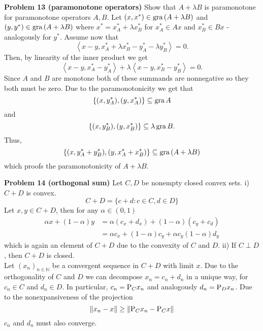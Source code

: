 \documentclass{scrartcl}
\newcommand{\N}{\mathbb{N}}
\newcommand{\sub}{\subseteq}
\theoremstyle{plain}
\theoremstyle{remark}
\renewcommand{\P}{\textup{P}}
\newcommand{\gr}{\textup{gra}\,}
\begin{document}
\textbf{Problem 13 (paramonotone operators)} Show that $A+\lambda B$ is paramonotone for paramonotone operators $A,B$.
Let $(x,x^*) \in  \gr (A+\lambda B)$ and $(y,y^*) \in \gr (A + \lambda B)$ where $x^* = x_A^* + \lambda x_B^*$ for $x_A^* \in Ax$ and $x_B^* \in Bx$ - analogously for $y^*$.
Assume now that
\begin{equation}
  \left\langle x-y, x_A^* + \lambda x_B^* - y_A^* - \lambda y_B^* \right\rangle = 0.
\end{equation}
Then, by linearity of the inner product we get
\begin{equation}
  \left\langle x-y, x_A^*  - y_A^*  \right\rangle + \lambda \left\langle x-y, x_B^* - y_B^* \right\rangle = 0.
\end{equation}
Since $A$ and $B$ are monotone both of these summands are nonnegative so they both must be zero.
Due to the paramonotonicity we get that
\begin{equation}
  \{(x,y_A^*), (y, x_A^*) \} \sub \gr A
\end{equation}
and
\begin{equation}
  \{(x,y_B^*), (y, x_B^*) \} \sub \lambda \, \gr B.
\end{equation}
Thus,
\begin{equation}
  \{(x, y_A^* + y_B^*), (y, x_A^* + x_B^*)\} \sub \gr (A + \lambda B)
\end{equation}
which proofs the paramonotonicity of $A+\lambda B$.


\textbf{Problem 14 (orthogonal sum)} Let $C, D$ be nonempty closed convex sets.
i) $C+D$ is convex.
\begin{equation}
  C+D = \{c+d : c \in C, d \in D\}
\end{equation}
Let $x,y \in C+D$, then for any $\alpha \in (0,1)$
\begin{equation}
  \begin{aligned}
    \alpha x+ (1 -\alpha)y &= \alpha(c_x + d_x) + (1-\alpha)(c_y + c_d)\\
    &= \alpha c_x + (1-\alpha) c_y + \alpha c_y (1-\alpha) d_y
  \end{aligned}
\end{equation}
which is again an element of $C+D$ due to the convexity of $C$ and $D$.
ii) If $C \perp D$, then $C+D$ is closed. \\
Let $(x_{n})_{n \in \N}$ be a convergent sequence in $C+D$ with limit $x$. Due to the orthogonality of $C$ and $D$ we can decompose $x_{n} = c_{n} + d_{n}$ in a unique way, for $c_{n} \in C$ and $d_{n} \in D$. In particular, $c_{n} = \P_{C}x_{n}$ and analogously $d_{n} = \P_{D}x_{n}$. Due to the nonexpansiveness of the projection 
\begin{equation}
  \lVert x_{n} - x \rVert \ge \lVert \P_{C}x_{n} - \P_{C}x \rVert
\end{equation}$c_{n}$ and $d_{n}$ must also converge.
\end{document}
